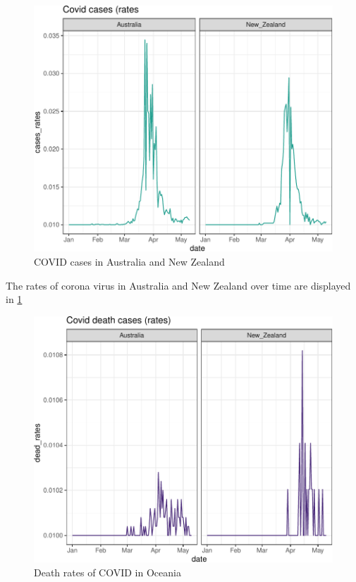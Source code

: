 \documentclass[11pt,a4paper,]{article}
\begin{document}
\begin{figure}

{\centering \includegraphics{Example_files/figure-latex/oceania-cases-1} 

}

\caption{COVID cases in Australia and New Zealand}\label{fig:oceania-cases}
\end{figure}

The rates of corona virus in Australia and New Zealand over time are displayed in \ref{fig:oceania-cases}

\begin{figure}

{\centering \includegraphics{Example_files/figure-latex/oceania-death-1} 

}

\caption{Death rates of COVID in Oceania}\label{fig:oceania-death}
\end{figure}
\end{document}
